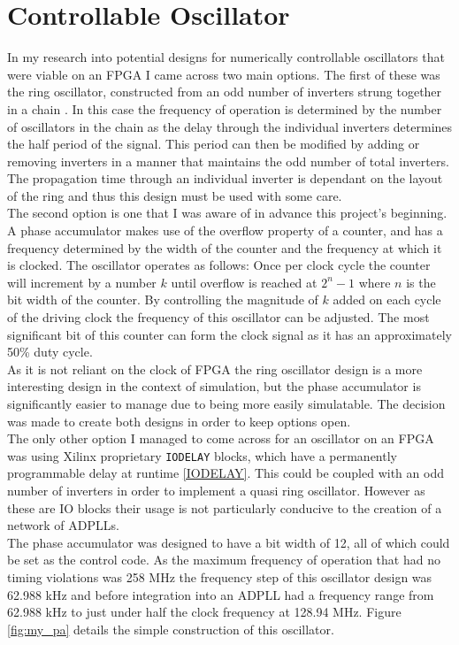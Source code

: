 \documentclass[11pt,english,british]{report}
\begin{document}
\section{Controllable Oscillator}
In my research into potential designs for numerically controllable oscillators that were viable on an FPGA I came across two main options. The first of these was the ring oscillator, constructed from an odd number of inverters strung together in a chain \cite{predraig}. In this case the frequency of operation is determined by the number of oscillators in the chain as the delay through the individual inverters determines the half period of the signal. This period can then be modified by adding or removing inverters in a manner that maintains the odd number of total inverters. The propagation time through an individual inverter is dependant on the layout of the ring and thus this design must be used with some care.\\
The second option is one that I was aware of in advance this project's beginning. A phase accumulator makes use of the overflow property of a counter, and has a frequency determined by the width of the counter and the frequency at which it is clocked. The oscillator operates as follows: Once per clock cycle the counter will increment by a number $k$ until overflow is reached at $2^n-1$ where $n$ is the bit width of the counter. By controlling the magnitude of $k$ added on each cycle of the driving clock the frequency of this oscillator can be adjusted. The most significant bit of this counter can form the clock signal as it has an approximately 50\% duty cycle.\\
As it is not reliant on the clock of FPGA the ring oscillator design is a more interesting design in the context of simulation, but the phase accumulator is significantly easier to manage due to being more easily simulatable. The decision was made to create both designs in order to keep options open.\\
The only other option I managed to come across for an oscillator on an FPGA was using Xilinx proprietary \texttt{IODELAY} blocks, which have a permanently programmable delay at runtime \ref{IODELAY}. This could be coupled with an odd number of inverters in order to implement a quasi ring oscillator. However as these are IO blocks their usage is not particularly conducive to the creation of a network of ADPLLs.\\
The phase accumulator was designed to have a bit width of 12, all of which could be set as the control code. As the maximum frequency of operation that had no timing violations was 258 MHz the frequency step of this oscillator design was 62.988 kHz and before integration into an ADPLL had a frequency range from 62.988 kHz to just under half the clock frequency at 128.94 MHz. Figure \ref{fig:my_pa} details the simple construction of this oscillator.\\
\end{document}
